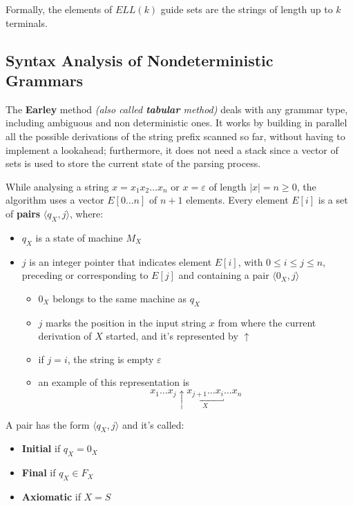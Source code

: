 \documentclass[english]{article}
\begin{document}
Formally, the elements of \(\textit{ELL}(k)\) guide sets are the strings of length up to \(k\) terminals.

\subsection{Syntax Analysis of Nondeterministic Grammars}

The \textbf{Earley} method \textit{(also called \textbf{tabular} method)} deals with any grammar type, including ambiguous and non deterministic ones.
It works by building in parallel all the possible derivations of the string prefix scanned so far, without having to implement a lookahead;
furthermore, it does not need a stack since a vector of sets is used to store the current state of the parsing process.

\bigskip
While analysing a string \(x = x_1 x_2 \ldots x_n\) or \(x = \varepsilon\) of length \(|x| = n \geq 0\), the algorithm uses a vector \(E\left[ 0 \ldots n \right]\) of \(n+1\) elements.
Every element \(E[i]\) is a set of \textbf{pairs} \(\langle q_X, j\rangle\), where:

\begin{itemize}
  \item \(q_X\) is a state of machine \(M_X\)
  \item \(j\) is an integer pointer that indicates element \(E[i]\), with \(0 \leq i \leq j \leq n\), preceding or corresponding to \(E[j]\) and containing a pair \(\langle 0_X, j \rangle\)
        \begin{itemize}
          \item \(0_X\) belongs to the same machine as \(q_X\)
          \item \(j\) marks the position in the input string \(x\) from where the current derivation of \(X\) started, and it's represented by \(\uparrow\)
          \item if \(j = i\), the string is empty \(\varepsilon\)
          \item an example of this representation is \[ x_1 \ldots x_j \uparrow \underbracket{x_{j+1}\ldots x_i}_{X} \ldots x_n \]
        \end{itemize}
\end{itemize}

\bigskip
A pair has the form \(\langle q_X, j \rangle\) and it's called:
\begin{itemize}
  \item \textbf{Initial} if \(q_X = 0_X\)
  \item \textbf{Final} if \(q_X \in F_X\)
  \item \textbf{Axiomatic} if \(X = S\)
\end{itemize}
\end{document}
